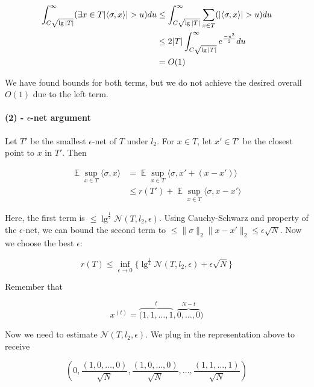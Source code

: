 \documentclass[11pt]{article}
\DeclareMathOperator*{\E}{\mathbb{E}}
\let\Pr\relax
\DeclareMathOperator*{\Pr}{\mathbb{P}}
\begin{document}
\begin{align*}
\int_{C\sqrt{\lg|T|}}^\infty \Pr (\exists x\in T |\langle \sigma, x \rangle| > u)du &\leq \int_{C\sqrt{\lg|T|}}^\infty \sum_{x\in T} \Pr (|\langle \sigma, x \rangle| > u)du \\
{} &\leq 2|T|\int_{C\sqrt{\lg|T|}}^\infty e^{\frac{-u^2}{2}}du \\
{} &= O(1)
\end{align*}

We have found bounds for both terms, but we do not achieve the desired overall $O(1)$ due to the left term. 

\paragraph{(2) - $\epsilon$-net argument}

Let $T'$ be the smallest $\epsilon$-net of $T$ under $l_2$. For $x\in T$, let $x' \in T'$ be the closest point to $x$ in $T'$. Then

\begin{align*}
\E \sup_{x \in T} \langle \sigma, x \rangle &= \E \sup_{x \in T}\langle \sigma, x' + (x - x') \rangle \\
											&\leq r(T') +  \E \sup_{x \in T}\langle \sigma, x - x' \rangle
\end{align*}

Here, the first term is $\leq \lg^{\frac{1}{2}}\mathcal{N}(T,l_2, \epsilon)$. Using Cauchy-Schwarz and property of the $\epsilon$-net, we can bound the second term to $\leq \lVert\sigma\rVert_2 \lVert x-x' \rVert_2 \leq \epsilon\sqrt{N}$. Now we choose the best $\epsilon$:

\begin{equation*}
r(T) \leq \inf_{\epsilon \rightarrow 0} \{ \lg^{\frac{1}{2}}\mathcal{N}(T,l_2, \epsilon) + \epsilon\sqrt{N} \}
\end{equation*}
 
Remember that 

\begin{equation*}
x^{(t)} = \overbrace{(1,1, \ldots, 1}^{t}, \overbrace{0, \ldots, 0}^{N-t})
\end{equation*}

Now we need to estimate $\mathcal{N}(T, l_2, \epsilon)$. We plug in the representation above to receive

\begin{equation*}
(0, \frac{(1,0,\ldots,0)}{\sqrt{N}},  \frac{(1,0,\ldots,0)}{\sqrt{N}}, \ldots, \frac{(1,1,\ldots,1)}{\sqrt{N}})
\end{equation*}
\end{document}
